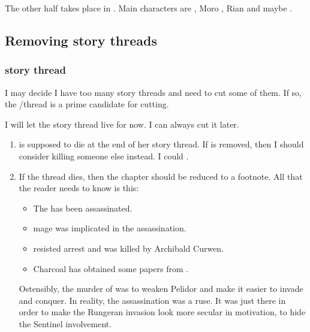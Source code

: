The other half takes place in \Malcur. 
Main characters are \Teshrial, Moro \Cobrel, Rian and maybe \Tiroco. 










\subsection{Removing story threads}





\subsubsection{\Tiroco story thread}
I may decide I have too many story threads and need to cut some of them.
If so, the \Tiroco/\Icor thread is a prime candidate for cutting. 

I will let the story thread live for now. 
I can always cut it later.

\begin{enumerate}
  \item 
    \Tiroco is supposed to die at the end of her story thread. 
    If \Tiroco is removed, then I should consider killing someone else instead. 
    I could . 
    
  \item 
    If the \Tiroco thread dies, then the  chapter should be reduced to a footnote.
    All that the reader needs to know is this:
    \begin{itemize}
      \item The \rayuth has been assassinated.
      \item \Ishrah mage \Ambrose \Onatol was implicated in the assassination.
      \item \Onatol resisted arrest and was killed by Archibald Curwen.
      \item Charcoal has obtained some papers from \Onatol. 
    \end{itemize}
    
    Ostensibly, the murder of \Icor was to weaken Pelidor and make it easier to invade and conquer. 
    In reality, the assassination was a ruse.
    It was just there in order to make the Rungeran invasion look more secular in motivation, to hide the Sentinel involvement. 
\end{enumerate}

























